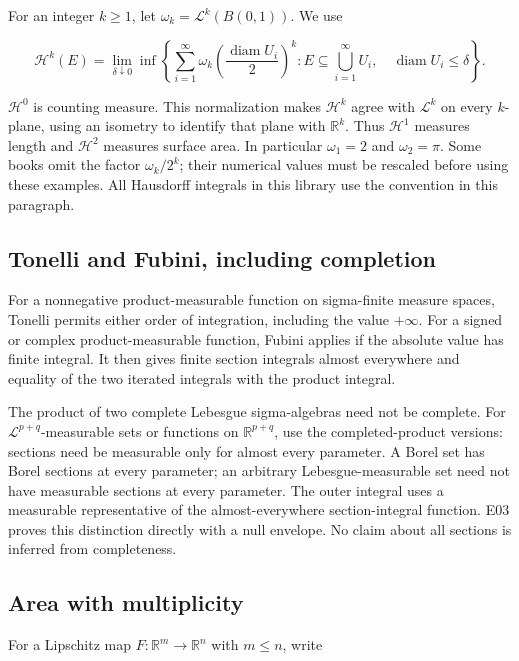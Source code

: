 \documentclass[
  11pt,
]{article}
\begin{document}
For an integer \(k\geq1\), let \(\omega_k=\mathcal L^k(B(0,1))\). We use

\[
\mathcal H^k(E)=\lim_{\delta\downarrow0}\inf\left\{
\sum_{i=1}^{\infty}\omega_k\left(\frac{\operatorname{diam}U_i}{2}\right)^k:
E\subseteq\bigcup_{i=1}^{\infty}U_i,\quad
\operatorname{diam}U_i\leq\delta\right\}.
\]

\(\mathcal H^0\) is counting measure. This normalization makes
\(\mathcal H^k\) agree with \(\mathcal L^k\) on every \(k\)-plane, using
an isometry to identify that plane with \(\mathbb R^k\). Thus
\(\mathcal H^1\) measures length and \(\mathcal H^2\) measures surface
area. In particular \(\omega_1=2\) and \(\omega_2=\pi\). Some books omit
the factor \(\omega_k/2^k\); their numerical values must be rescaled
before using these examples. All Hausdorff integrals in this library use
the convention in this paragraph.

\subsection{Tonelli and Fubini, including
completion}\label{tonelli-and-fubini-including-completion}

For a nonnegative product-measurable function on sigma-finite measure
spaces, Tonelli permits either order of integration, including the value
\(+\infty\). For a signed or complex product-measurable function, Fubini
applies if the absolute value has finite integral. It then gives finite
section integrals almost everywhere and equality of the two iterated
integrals with the product integral.

The product of two complete Lebesgue sigma-algebras need not be
complete. For \(\mathcal L^{p+q}\)-measurable sets or functions on
\(\mathbb R^{p+q}\), use the completed-product versions: sections need
be measurable only for almost every parameter. A Borel set has Borel
sections at every parameter; an arbitrary Lebesgue-measurable set need
not have measurable sections at every parameter. The outer integral uses
a measurable representative of the almost-everywhere section-integral
function. E03 proves this distinction directly with a null envelope. No
claim about all sections is inferred from completeness.

\subsection{Area with multiplicity}\label{area-with-multiplicity}

For a Lipschitz map \(F:\mathbb R^m\to\mathbb R^n\) with \(m\leq n\),
write
\end{document}
